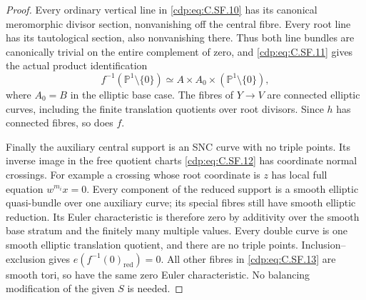 \begin{proof}
Every ordinary vertical line
in \eqref{cdp:eq:C.SF.10} has its canonical
meromorphic divisor section,
nonvanishing off the central
fibre. Every root line has
its tautological section,
also nonvanishing there.
Thus both line bundles are
canonically trivial on the
entire complement of zero,
and \eqref{cdp:eq:C.SF.11} gives the
actual product identification
\[
 f^{-1}(\mathbb P^1\setminus\{0\})
   \simeq A\times A_0\times
                         (\mathbb P^1\setminus\{0\}),
                                                               \tag{C.SF.13}\label{cdp:eq:C.SF.13}
\]
where $A_0=B$ in the elliptic
base case. The fibres of
$Y\to V$ are connected
elliptic curves, including
the finite translation
quotients over root divisors.
Since $h$ has connected
fibres, so does $f$.

Finally the auxiliary central
support is an SNC curve
with no triple points.
Its inverse image in the
free quotient charts
\eqref{cdp:eq:C.SF.12} has coordinate
normal crossings. For
example a crossing whose
root coordinate is $z$
has local full equation
$w^{m_i}x=0$. Every
component of the reduced
support is a smooth
elliptic quasi-bundle over
one auxiliary curve; its
special fibres still have
smooth elliptic reduction.
Its Euler characteristic
is therefore zero by
additivity over the smooth
base stratum and the
finitely many multiple
values. Every double
curve is one smooth
elliptic translation
quotient, and there are
no triple points.
Inclusion--exclusion gives
$e(f^{-1}(0)_{\mathrm{red}})=0$.
All other fibres in
\eqref{cdp:eq:C.SF.13} are smooth tori,
so have the same zero
Euler characteristic.
No balancing modification
of the given $S$ is needed.
\end{proof}


